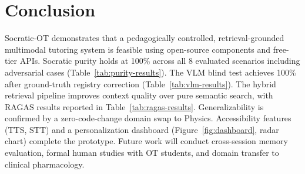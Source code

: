 \documentclass[11pt]{article}
\begin{document}
\section{Conclusion}

Socratic-OT demonstrates that a pedagogically controlled, retrieval-grounded
multimodal tutoring system is feasible using open-source components and
free-tier APIs.
Socratic purity holds at 100\% across all 8 evaluated scenarios including
adversarial cases (Table~\ref{tab:purity-results}).
The VLM blind test achieves 100\% after ground-truth registry correction
(Table~\ref{tab:vlm-results}).
The hybrid retrieval pipeline improves context quality over pure semantic
search, with RAGAS results reported in Table~\ref{tab:ragas-results}.
Generalizability is confirmed by a zero-code-change domain swap to Physics.
Accessibility features (TTS, STT) and a personalization dashboard
(Figure~\ref{fig:dashboard}, radar chart) complete the prototype.
Future work will conduct cross-session memory evaluation, formal human
studies with OT students, and domain transfer to clinical pharmacology.


\end{document}
